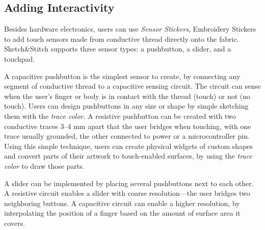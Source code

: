 \documentclass[header.tex]{subfiles}
\begin{document}
\subsection{Adding Interactivity}
Besides hardware electronics, users can use \textit{Sensor Stickers}, Embroidery Stickers to add touch sensors made from conductive thread directly onto the fabric. Sketch\&Stitch supports three sensor types: a pushbutton, a slider, and a touchpad.

A capacitive pushbutton is the simplest sensor to create, by connecting any segment of conductive thread to a capacitive sensing circuit. The circuit can sense when the user's finger or body is in contact with the thread (touch) or not (no touch). Users can design pushbuttons in any size or shape by simple sketching them with the \textit{trace color}. A resistive pushbutton can be created with two conductive traces 3--4 mm apart that the user bridges when touching, with one trace usually grounded, the other connected to power or a microcontroller pin. Using this simple technique, users can create physical widgets of custom shapes and convert parts of their artwork to touch-enabled surfaces, by using the \textit{trace color} to draw those parts.


A slider can be implemented by placing several pushbuttons next to each other. A resistive circuit enables a slider with coarse resolution---the user bridges two neighboring buttons. A capacitive circuit can enable a higher resolution, by interpolating the position of a finger based on the amount of surface area it covers. %

\end{document}
